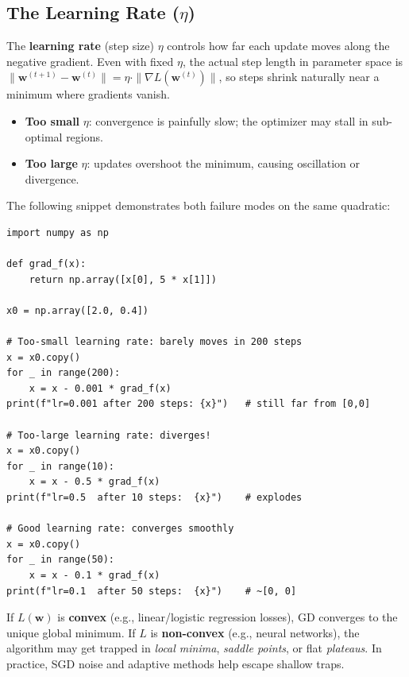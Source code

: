 \subsection*{The Learning Rate ($\eta$)}

The \textbf{learning rate} (step size) $\eta$ controls how far each update moves along the negative gradient. Even with fixed $\eta$, the actual step length in parameter space is $\|\mathbf{w}^{(t+1)} - \mathbf{w}^{(t)}\| = \eta \cdot \|\nabla L(\mathbf{w}^{(t)})\|$, so steps shrink naturally near a minimum where gradients vanish.

\begin{itemize}
    \item \textbf{Too small} $\eta$: convergence is painfully slow; the optimizer may stall in sub-optimal regions.
    \item \textbf{Too large} $\eta$: updates overshoot the minimum, causing oscillation or divergence.
\end{itemize}

The following snippet demonstrates both failure modes on the same quadratic:

\begin{lstlisting}[style=pythonstyle]
import numpy as np

def grad_f(x):
    return np.array([x[0], 5 * x[1]])

x0 = np.array([2.0, 0.4])

# Too-small learning rate: barely moves in 200 steps
x = x0.copy()
for _ in range(200):
    x = x - 0.001 * grad_f(x)
print(f"lr=0.001 after 200 steps: {x}")   # still far from [0,0]

# Too-large learning rate: diverges!
x = x0.copy()
for _ in range(10):
    x = x - 0.5 * grad_f(x)
print(f"lr=0.5  after 10 steps:  {x}")    # explodes

# Good learning rate: converges smoothly
x = x0.copy()
for _ in range(50):
    x = x - 0.1 * grad_f(x)
print(f"lr=0.1  after 50 steps:  {x}")    # ~[0, 0]
\end{lstlisting}

\begin{remark}
If $L(\mathbf{w})$ is \textbf{convex} (e.g., linear/logistic regression losses), GD converges to the unique global minimum. If $L$ is \textbf{non-convex} (e.g., neural networks), the algorithm may get trapped in \textit{local minima}, \textit{saddle points}, or flat \textit{plateaus}. In practice, SGD noise and adaptive methods help escape shallow traps.
\end{remark}

